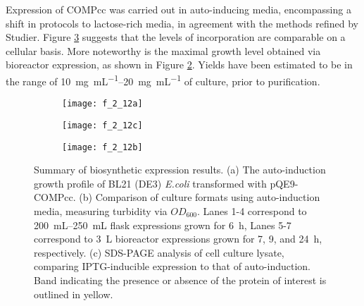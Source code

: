\begin{refsection}
Expression of COMPcc was carried out in auto-inducing media, encompassing a
shift in protocols to lactose-rich media, in agreement with the methods refined
by Studier.\cite{Studier2005} Figure \ref{fig:AI_IPTG_gel} suggests that the
levels of incorporation are comparable on a cellular basis. More noteworthy is
the maximal growth level obtained via bioreactor expression, as shown in Figure
\ref{fig:bioreactor_OD_comparison}. Yields have been estimated to be in the
range of \SIrange{10}{20}{\mg\per\mL} of culture, prior to purification.
\begin{figure}[h!]
    \centering
    \begin{subfigure}[b]{0.3\textwidth}
        \texttt{[image: f\_2\_12a]}
        \caption{}
        \label{fig:AI_OD_curve}
    \end{subfigure}
    \begin{subfigure}[b]{0.3\textwidth}
        \texttt{[image: f\_2\_12c]}
        \caption{}
        \label{fig:bioreactor_OD_comparison}
    \end{subfigure}
    \begin{subfigure}[b]{0.3\textwidth}
        \texttt{[image: f\_2\_12b]}
        \caption{}
        \label{fig:AI_IPTG_gel} \end{subfigure}
    \caption[Summary of biosynthetic expresssion results]{Summary of
        biosynthetic expression results. (a) The auto-induction growth profile
        of BL21 (DE3) \emph{E.coli} transformed with pQE9-COMPcc. (b) Comparison
        of culture formats using auto-induction media, measuring turbidity via
        ${OD_{600}}$. Lanes 1-4 correspond to \SIrange{200}{250}{\mL} flask
        expressions grown for \SI{6}{\hour}, Lanes 5-7 correspond to \SI{3}{\L}
        bioreactor expressions grown for 7, 9, and \SI{24}{\hour}, respectively.
    (c) SDS-PAGE analysis of cell culture lysate, comparing IPTG-inducible
expression to that of auto-induction. Band indicating the presence or absence of
the protein of interest is outlined in yellow.}
\label{fig:expression_results}
\end{figure}



\end{refsection}
